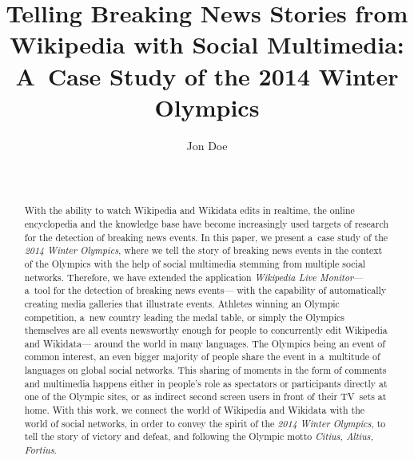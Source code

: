 \documentclass{sig-alternate}
\begin{document}
%

\title{Telling Breaking News Stories from Wikipedia with Social Multimedia: A~Case Study of the 2014 Winter Olympics}


\author{
\alignauthor
Jon Doe\\%
  \\%
  \\       %
}

\maketitle
\begin{abstract}
\selectfont
With the ability to watch Wikipedia
and Wikidata edits in realtime,
the online encyclopedia and the knowledge base
have become increasingly used targets of research
for the detection of breaking news events.
In this paper, we present a~case study of the
\emph{2014 Winter Olympics}, where we tell the story of
breaking news events in the context of the Olympics
with the help of social multimedia
stemming from multiple social networks.
Therefore, we have extended the application
\emph{Wikipedia Live Monitor}---%
a~tool for the detection of breaking news events---%
with the capability of automatically creating
media galleries that illustrate events.
Athletes winning an Olympic competition,
a~new country leading the medal table,
or simply the Olympics themselves are all events
newsworthy enough for people to concurrently
edit Wikipedia and Wikidata---%
around the world in many languages.
The Olympics being an event of common interest,
an even bigger majority of people share the event
in a~multitude of languages on global social networks.
This sharing of moments in the form of comments and multimedia
happens either in people's role as spectators or participants
directly at one of the Olympic sites,
or as indirect second screen users
in front of their TV~sets at home.
With this work, we connect the world of
Wikipedia and Wikidata with the world of social networks,
in order to convey the spirit of the
\emph{2014 Winter Olympics},
to tell the story of victory and defeat,
and following the Olympic motto \emph{Citius, Altius, Fortius}.
\end{abstract}
\end{document}
